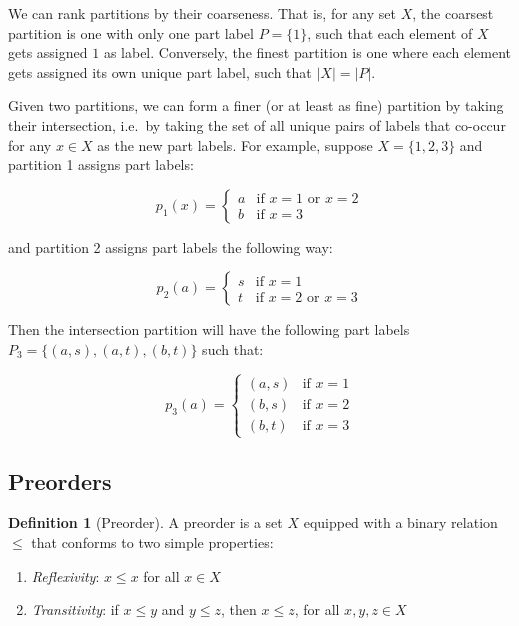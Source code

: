 \documentclass[
]{book}
\providecommand{\tightlist}{%
  \setlength{\itemsep}{0pt}\setlength{\parskip}{0pt}}
\theoremstyle{definition}
\newtheorem{definition}{Definition}[chapter]
\theoremstyle{definition}
\theoremstyle{definition}
\theoremstyle{definition}
\theoremstyle{remark}
\begin{document}
We can rank partitions by their coarseness. That is, for any set \(X\), the coarsest partition is one with only one part label \(P = \{ 1 \}\), such that each element of \(X\) gets assigned \(1\) as label. Conversely, the finest partition is one where each element gets assigned its own unique part label, such that \(\lvert X \lvert = \lvert P \lvert\).

Given two partitions, we can form a finer (or at least as fine) partition by taking their intersection, i.e.~by taking the set of all unique pairs of labels that co-occur for any \(x \in X\) as the new part labels. For example, suppose \(X = \{ 1, 2, 3 \}\) and partition 1 assigns part labels:

\[p_1(x) = \begin{cases} 
a & \text{if } x = 1 \text{ or } x = 2 \\
b & \text{if } x = 3
\end{cases}\]

and partition 2 assigns part labels the following way:

\[
p_2(a) = \begin{cases}
s & \text{if } x = 1 \\
t & \text{if } x = 2 \text{ or } x = 3
\end{cases}
\]

Then the intersection partition will have the following part labels \(P_3 = \{ (a, s), (a, t), (b, t) \}\) such that:

\[
p_3(a) = \begin{cases}
(a, s) & \text{if } x = 1 \\
(b, s) & \text{if } x = 2 \\ 
(b, t) & \text{if } x = 3
\end{cases}
\]

\subsection{Preorders}\label{preorders}

\begin{definition}[Preorder]

A preorder is a set \(X\) equipped with a binary relation \(\leq\) that conforms to two simple properties:

\begin{enumerate}
\def\labelenumi{\arabic{enumi}.}
\tightlist
\item
  \emph{Reflexivity}: \(x \leq x\) for all \(x \in X\)
\item
  \emph{Transitivity}: if \(x \leq y\) and \(y \leq z\), then \(x \leq z\), for all \(x, y, z \in X\)
\end{enumerate}

\end{definition}
\end{document}
